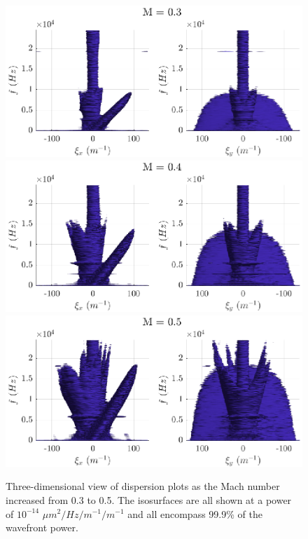 \begin{figure}
  \centering
  \includegraphics{../matlab/04_dispersion_analysis/dispersion_mach_0.3.eps}
  \includegraphics{../matlab/04_dispersion_analysis/dispersion_mach_0.4.eps}
  \includegraphics{../matlab/04_dispersion_analysis/dispersion_mach_0.5.eps}
  \caption{Three-dimensional view of dispersion plots as the Mach number increased from 0.3 to 0.5. The isosurfaces are all shown at a power of $10^{-14}$ $\mu m^2/Hz/m^{-1}/m^{-1}$ and all encompass 99.9\% of the wavefront power.}
  \label{fig:04_dispersion_mach}
\end{figure}
